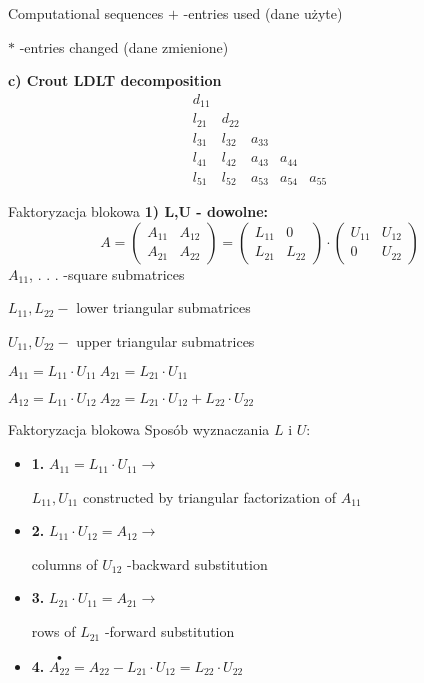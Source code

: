 \begin{frame}{Computational sequences}
$+$ -entries used (dane użyte)

$*$ -entries changed (dane zmienione)

\textbf{c) Crout LDLT decomposition}
$$
\begin{array}{lllll}
d_{11}\\
l_{21} & d_{22}\\
l_{31} & l_{32} & a_{33}\\
l_{41} & l_{42} & a_{43} & a_{44} \\
l_{51} & l_{52} & a_{53} & a_{54} &  a_{55}
\end{array}
$$
\end{frame}
\begin{frame}{Faktoryzacja blokowa}
\textbf{ 1) L,U - dowolne: }
$$
A=\left(\begin{array}{ll}
A_{11} & A_{12}\\
A_{21} & A_{22}
\end{array}\right)=\left(\begin{array}{ll}
L_{11} & 0\\
L_{21} & L_{22}
\end{array}\right)\cdot\left(\begin{array}{ll}
U_{11} & U_{12}\\
0 & U_{22}
\end{array}\right)
$$
$A_{11}$, . . . -square submatrices 

$L_{11}, L_{22}-$ lower triangular submatrices 

$U_{11}, U_{22}-$ upper triangular submatrices
\begin{flushright}
$
A_{11}=L_{11}\cdot U_{11}\ A_{21}=L_{21}\cdot U_{11}
$
\end{flushright}
\begin{flushright}
$
A_{12}=L_{11}\cdot U_{12}\ A_{22}=L_{21}\cdot U_{12}+L_{22}\cdot U_{22}
$
\end{flushright}

\end{frame}
\begin{frame}{Faktoryzacja blokowa}
Sposób wyznaczania $L$ i $U$:

\begin{itemize}
\item   \textbf{1.} $A_{11}=L_{11}\cdot U_{11}\rightarrow$

$L_{11}, U_{11}$ constructed by triangular factorization of $A_{11}$
\item \textbf{2.} $ L_{11}\cdot U_{12}=A_{12}\rightarrow$

columns of $U_{12}$ -backward substitution

\item \textbf{3.} $L_{21}\cdot U_{11}=A_{21}\rightarrow$

rows of $L_{21}$ -forward substitution 
\item \textbf{4.}  $\overset{\bullet}{A_{22}}=A_{22}-L_{21}\cdot U_{12}=L_{22}\cdot U_{22}$
\end{itemize}

\end{frame}
